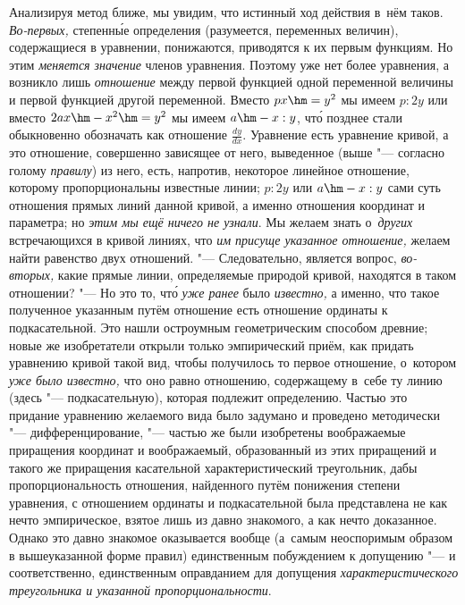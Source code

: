Анализируя метод ближе, мы увидим, что истинный ход действия в~нём таков.
{\em Во-первых,} степенн\'{ы}е определения (разумеется, переменных величин),
содержащиеся в уравнении, понижаются, приводятся к их первым функциям. Но этим
{\em меняется значение} членов уравнения. Поэтому уже нет более уравнения,
а возникло лишь {\em отношение} между первой функцией одной переменной величины
и первой функцией другой переменной. Вместо $px\hm=y^2$ мы имеем $p:2y$ или
вместо $2ax\hm-x^2\hm=y^2$ мы имеем $a\hm-x:y$, чт\'{о} позднее стали
обыкновенно обозначать как отношение $\frac{dy}{dx}$. Уравнение есть уравнение
кривой, а это отношение, совершенно зависящее от него, выведенное (выше "---
согласно голому {\em правилу}) из него, есть, напротив, некоторое линейное
отношение, которому пропорциональны известные линии; $p:2y$ или $a\hm-x:y$ сами
суть отношения прямых линий данной кривой, а именно отношения координат и
параметра; но {\em этим мы ещё ничего не узнали}. Мы желаем знать
о~{\em других} встречающихся в кривой линиях, что {\em им присуще указанное
отношение,} желаем найти равенство двух отношений. "--- Следовательно, является
вопрос, {\em во-вторых,} какие прямые линии, определяемые природой кривой,
находятся в таком отношении? "--- Но это то, чт\'{о} {\em уже ранее} было
{\em известно,} а именно, что такое полученное указанным путём отношение есть
отношение ординаты к подкасательной. Это нашли остроумным геометрическим
способом древние; новые же изобретатели открыли только эмпирический приём, как
придать уравнению кривой такой вид, чтобы получилось то первое отношение,
о~котором {\em уже было известно,} что оно равно отношению, содержащему в~себе
ту линию (здесь "--- подкасательную), которая подлежит определению. Частью это
придание уравнению желаемого вида было задумано и проведено методически
"--- дифференцирование, "--- частью же были изобретены воображаемые
приращения координат и воображаемый, образованный из этих приращений и
такого же приращения касательной характеристический треугольник, дабы
пропорциональность отношения, найденного путём понижения степени уравнения,
с отношением ординаты и подкасательной была представлена не как нечто
эмпирическое, взятое лишь из давно знакомого, а как нечто доказанное.
Однако это давно знакомое оказывается вообще (а~самым неоспоримым образом в
вышеуказанной форме правил) единственным побуждением к допущению "--- и
соответственно, единственным оправданием для допущения
{\em характеристического треугольника и указанной пропорциональности}.

